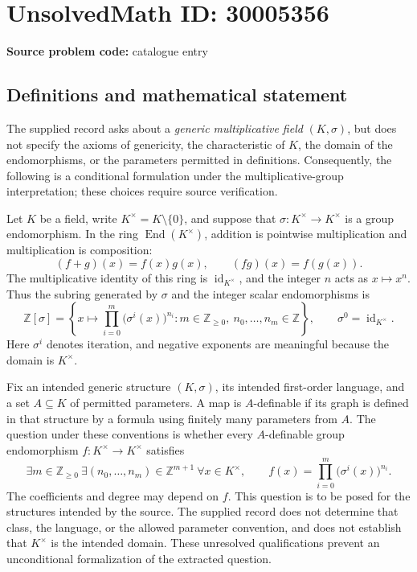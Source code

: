 \documentclass[11pt]{article}
\begin{document}
\section*{UnsolvedMath ID: 30005356}
\textbf{Source problem code:} catalogue entry
\subsection{Definitions and mathematical statement}
The supplied record asks about a \emph{generic multiplicative field} $(K,\sigma)$, but does not specify the axioms of genericity, the characteristic of $K$, the domain of the endomorphisms, or the parameters permitted in definitions. Consequently, the following is a conditional formulation under the multiplicative-group interpretation; these choices require source verification.

Let $K$ be a field, write $K^\times=K\setminus\{0\}$, and suppose that $\sigma:K^\times\to K^\times$ is a group endomorphism. In the ring $\operatorname{End}(K^\times)$, addition is pointwise multiplication and multiplication is composition:
\[
(f+g)(x)=f(x)g(x),\qquad (fg)(x)=f(g(x)).
\]
The multiplicative identity of this ring is $\operatorname{id}_{K^\times}$, and the integer $n$ acts as $x\mapsto x^n$. Thus the subring generated by $\sigma$ and the integer scalar endomorphisms is
\[
\mathbb Z[\sigma]
=\left\{x\longmapsto\prod_{i=0}^{m}\bigl(\sigma^i(x)\bigr)^{n_i}:
 m\in\mathbb Z_{\geq0},\ n_0,\ldots,n_m\in\mathbb Z\right\},
\qquad \sigma^0=\operatorname{id}_{K^\times}.
\]
Here $\sigma^i$ denotes iteration, and negative exponents are meaningful because the domain is $K^\times$.

Fix an intended generic structure $(K,\sigma)$, its intended first-order language, and a set $A\subseteq K$ of permitted parameters. A map is $A$-definable if its graph is defined in that structure by a formula using finitely many parameters from $A$. The question under these conventions is whether every $A$-definable group endomorphism $f:K^\times\to K^\times$ satisfies
\[
\exists m\in\mathbb Z_{\geq0}\ \exists(n_0,\ldots,n_m)\in\mathbb Z^{m+1}\ \forall x\in K^\times,
\qquad f(x)=\prod_{i=0}^{m}\bigl(\sigma^i(x)\bigr)^{n_i}.
\]
The coefficients and degree may depend on $f$. This question is to be posed for the structures intended by the source. The supplied record does not determine that class, the language, or the allowed parameter convention, and does not establish that $K^\times$ is the intended domain. These unresolved qualifications prevent an unconditional formalization of the extracted question.
\end{document}
